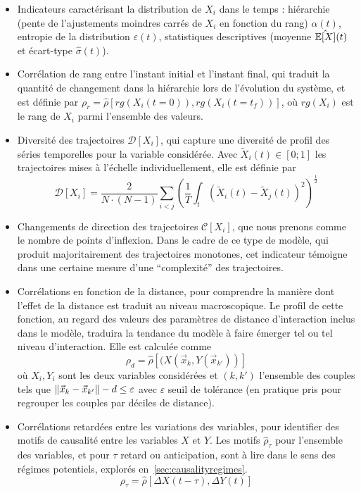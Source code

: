 \begin{itemize}
  \item Indicateurs caractérisant la distribution de $X_i$ dans le temps : hiérarchie (pente de l'ajustements moindres carrés de $X_i$ en fonction du rang) $\alpha (t)$, entropie de la distribution $\varepsilon (t)$, statistiques descriptives (moyenne $\hat{\operatorname{\mathbb{E}}\!\left[X\right]} (t)$ et écart-type $\hat{\sigma} (t)$).
  \item Corrélation de rang entre l'instant initial et l'instant final, qui traduit la quantité de changement dans la hiérarchie lors de l'évolution du système, et est définie par $\rho_r = \hat{\rho}\left[rg(X_i(t=0)),rg(X_i(t=t_f))\right]$, où $rg(X_i)$ est le rang de $X_i$ parmi l'ensemble des valeurs.
  \item Diversité des trajectoires $\mathcal{D}\left[X_i\right]$, qui capture une diversité de profil des séries temporelles pour la variable considérée. Avec $\tilde{X}_i(t)\in \left[0;1\right]$ les trajectoires mises à l'échelle individuellement, elle est définie par
\[
\mathcal{D}\left[X_i\right] = \frac{2}{N\cdot(N-1)}\sum_{i<j} \left(\frac{1}{T}\int_{t} \left(\tilde{X}_i(t) - \tilde{X}_j(t)\right)^2 \right)^{\frac{1}{2}}
\]
\item Changements de direction des trajectoires $\mathcal{C}\left[X_i\right]$, que nous prenons comme le nombre de points d'inflexion. Dans le cadre de ce type de modèle, qui produit majoritairement des trajectoires monotones, cet indicateur témoigne dans une certaine mesure d'une ``complexité'' des trajectoires.
\item Corrélations en fonction de la distance, pour comprendre la manière dont l'effet de la distance est traduit au niveau macroscopique. Le profil de cette fonction, au regard des valeurs des paramètres de distance d'interaction inclus dans le modèle, traduira la tendance du modèle à faire émerger tel ou tel niveau d'interaction. Elle est calculée comme
\[
\rho_d = \hat{\rho}\left[(X(\vec{x}_k,Y(\vec{x}_{k'}))\right]
\]
où $X_i, Y_i$ sont les deux variables considérées et $(k,k')$ l'ensemble des couples tels que $\| \vec{x}_k-\vec{x}_{k'} \| - d \leq \varepsilon$ avec $\varepsilon$ seuil de tolérance (en pratique pris pour regrouper les couples par déciles de distance).
\item Corrélations retardées entre les variations des variables, pour identifier des motifs de causalité entre les variables $X$ et $Y$. Les motifs $\hat{\rho}_{\tau}$ pour l'ensemble des variables, et pour $\tau$ retard ou anticipation, sont à lire dans le sens des régimes potentiels, explorés en~\ref{sec:causalityregimes}.
\[
\rho_{\tau} = \hat{\rho}\left[\Delta X(t-\tau),\Delta Y(t)\right]
\]
\end{itemize}

